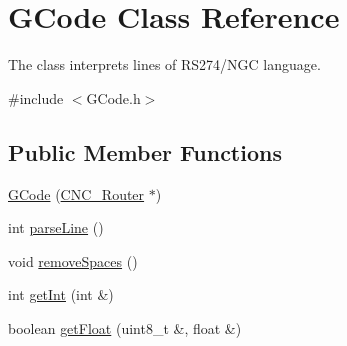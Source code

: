 \hypertarget{class_g_code}{\section{G\+Code Class Reference}
\label{class_g_code}
}


The class interprets lines of R\+S274/\+N\+G\+C language.  




{\ttfamily \#include $<$G\+Code.\+h$>$}

\subsection*{Public Member Functions}
\begin{DoxyCompactItemize}
\item 
\hyperlink{class_g_code_afb47ef5c3500e0534e54607abfd73d47}{G\+Code} (\hyperlink{class_c_n_c___router}{C\+N\+C\+\_\+\+Router} $\ast$)
\item 
int \hyperlink{class_g_code_a1785db665332977787a38b6b2563b395}{parse\+Line} ()
\item 
void \hyperlink{class_g_code_a3912e1dad7257e2336ab09c55ff17235}{remove\+Spaces} ()
\item 
int \hyperlink{class_g_code_a609aaf5606ffd2013a957e97641b1530}{get\+Int} (int \&)
\item 
boolean \hyperlink{class_g_code_a8fa0eb551f6186b9d083c86188dabb56}{get\+Float} (uint8\+\_\+t \&, float \&)
\end{DoxyCompactItemize}
